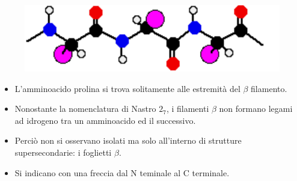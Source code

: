 \documentclass{beamer}
\begin{document}
\begin{frame}\begin{figure}
\includegraphics[scale=0.4]{bstrand.pdf}
\end{figure}
\begin{itemize}
\pause \item L'amminoacido prolina si trova solitamente alle estremità del $\beta$ filamento.
\pause \item Nonostante la nomenclatura di Nastro $2_7$, i filamenti $\beta$ non formano legami ad idrogeno tra un amminoacido ed il successivo. 
\pause \item Perciò non si osservano isolati ma solo all'interno di strutture supersecondarie: i foglietti $\beta$.
\pause \item Si indicano con una freccia dal N teminale al C terminale.
\end{itemize}

\end{frame}
\end{document}
